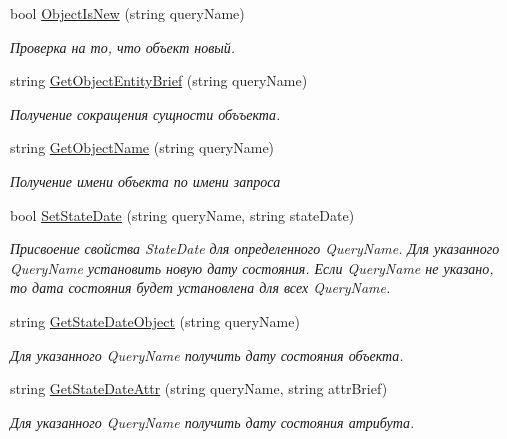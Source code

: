 \begin{DoxyCompactItemize}
bool \mbox{\hyperlink{class_f_b_a_1_1_object_ref_aae6a881f8e59f323cbd67b9bd426888a}{Object\+Is\+New}} (string query\+Name)
\begin{DoxyCompactList}\small\item\em Проверка на то, что объект новый. \end{DoxyCompactList}\item 
string \mbox{\hyperlink{class_f_b_a_1_1_object_ref_a3d5c108d064ee713747bc62a2acf053e}{Get\+Object\+Entity\+Brief}} (string query\+Name)
\begin{DoxyCompactList}\small\item\em Получение сокращения сущности объъекта. \end{DoxyCompactList}\item 
string \mbox{\hyperlink{class_f_b_a_1_1_object_ref_ad87b5a2c9d5b8984ae100a8b994f0e80}{Get\+Object\+Name}} (string query\+Name)
\begin{DoxyCompactList}\small\item\em Получение имени объекта по имени запроса \end{DoxyCompactList}\item 
bool \mbox{\hyperlink{class_f_b_a_1_1_object_ref_a605154c3bdc9d8df453b6586205428f2}{Set\+State\+Date}} (string query\+Name, string state\+Date)
\begin{DoxyCompactList}\small\item\em Присвоение свойства State\+Date для определенного Query\+Name. Для указанного Query\+Name установить новую дату состояния. Если Query\+Name не указано, то дата состояния будет установлена для всех Query\+Name. \end{DoxyCompactList}\item 
string \mbox{\hyperlink{class_f_b_a_1_1_object_ref_ae55bdfa098646198acb8c48bfaa70d82}{Get\+State\+Date\+Object}} (string query\+Name)
\begin{DoxyCompactList}\small\item\em Для указанного Query\+Name получить дату состояния объекта. \end{DoxyCompactList}\item 
string \mbox{\hyperlink{class_f_b_a_1_1_object_ref_aa556797383dfa9978fb7cf040d2aad93}{Get\+State\+Date\+Attr}} (string query\+Name, string attr\+Brief)
\begin{DoxyCompactList}\small\item\em Для указанного Query\+Name получить дату состояния атрибута. \end{DoxyCompactList}\end{DoxyCompactItemize}
